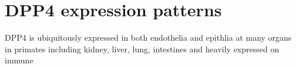 \section{DPP4 expression patterns}
DPP4 is ubiquitously expressed in both endothelia and epithlia at many organs in primates including kidney, liver, lung, intestines and heavily expressed on immune 